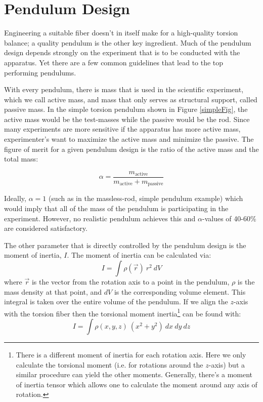 \documentclass{book}
\begin{document}
\section{Pendulum Design}

\quad Engineering a suitable fiber doesn't in itself make for a high-quality torsion balance; a quality pendulum is the other key ingredient. Much of the pendulum design depends strongly on the experiment that is to be conducted with the apparatus. Yet there are a few common guidelines that lead to the top performing pendulums. 

With every pendulum, there is mass that is used in the scientific experiment, which we call active mass, and mass that only serves as structural support, called passive mass. In the simple torsion pendulum shown in Figure \ref{simpleFig}, the active mass would be the test-masses while the passive would be the rod. Since many experiments are more sensitive if the apparatus has more active mass, experimenter's want to maximize the active mass and minimize the passive. The figure of merit for a given pendulum design is the ratio of the active mass and the total mass:

\begin{equation}
\alpha = \frac{m_{\text{active}}}{m_{\text{active}}+m_{\text{passive}}}
\end{equation}

Ideally, $\alpha=1$ (such as in the massless-rod, simple pendulum example) which would imply that all of the mass of the pendulum is participating in the experiment. However, no realistic pendulum achieves this and $\alpha$-values of 40-60\% are considered satisfactory.

The other parameter that is directly controlled by the pendulum design is the moment of inertia, $I$. The moment of inertia can be calculated via:
\begin{equation}
I=\int \rho(\vec{r})\ r^2\ dV
\end{equation}
where $\vec{r}$ is the vector from the rotation axis to a point in the pendulum, $\rho$ is the mass density at that point, and $dV$ is the corresponding volume element. This integral is taken over the entire volume of the pendulum.
If we align the $z$-axis with the torsion fiber then the torsional moment inertia\footnote{There is a different moment of inertia for each rotation axis. Here we only calculate the torsional moment (i.e. for rotations around the $z$-axis) but a similar procedure can yield the other moments. Generally, there's a moment of inertia tensor which allows one to calculate the moment around any axis of rotation.} can be found with:
\begin{equation}
I=\int \rho(x,y,z)\ (x^2+y^2)\ dx\ dy\ dz
\end{equation}
\end{document}
